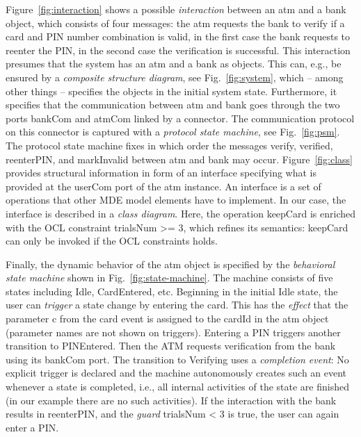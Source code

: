 \documentclass[10pt,fleqn,final]{scrreprt}
\newenvironment{definitions}[0]{\medskip }{}
\newcommand{\uml}[1]{\textsf{#1}}
\begin{document}
\begin{definitions}
Figure~\ref{fig:interaction} shows a possible \emph{interaction}
between an \uml{atm} and a \uml{bank} object, which consists of
four messages: the \uml{atm} requests the \uml{bank} to \uml{verify}
if a card and PIN number combination is valid, in the first case the
\uml{bank} requests to reenter the PIN, in the second case the
verification is successful.  This interaction presumes that the system
has an \uml{atm} and a \uml{bank} as objects. This can, e.g., be
ensured by a \emph{composite structure diagram}, see
Fig.~\ref{fig:system}, which -- among other things -- specifies the
objects in the initial system state.  Furthermore, it specifies that
the communication between \uml{atm} and \uml{bank} goes through the
two ports \uml{bankCom} and \uml{atmCom} linked by a connector.  The
communication protocol on this connector is captured with a
\emph{protocol state machine}, see Fig.~\ref{fig:psm}.  The protocol
state machine fixes in which order the messages \uml{verify},
\uml{verified}, \uml{reenterPIN}, and \uml{markInvalid} between
\uml{atm} and \uml{bank} may occur.  Figure~\ref{fig:class} provides
structural information in form of an interface specifying what is
provided at the \uml{userCom} port of the \uml{atm} instance. An
interface is a set of operations that other MDE model elements have to
implement. In our case, the interface is described in a \emph{class
  diagram}. Here, the operation \uml{keepCard} is enriched with the
OCL constraint \uml{trialsNum >= 3}, which refines its semantics:
\uml{keepCard} can only be invoked if the OCL constraints holds.

Finally, the dynamic behavior of the \uml{atm} object is specified by
the \emph{behavioral state machine} shown in
Fig.~\ref{fig:state-machine}. The machine consists of five states
including \uml{Idle}, \uml{CardEntered}, etc.  Beginning in the
initial \uml{Idle} state, the user can \emph{trigger} a state change
by entering the \uml{card}. This has the \emph{effect} that the
parameter \uml{c} from the \uml{card} event is assigned to the
\uml{cardId} in the \uml{atm} object (parameter names are not shown on
triggers). Entering a \uml{PIN} triggers another transition to
\uml{PINEntered}.  Then the ATM requests verification from the bank
using its \uml{bankCom} port.  The transition to \uml{Verifying} uses
a \emph{completion event}: No explicit trigger is declared and the
machine autonomously creates such an event whenever a state is
completed, i.e., all internal activities of the state are finished (in
our example there are no such activities).  If the interaction with
the bank results in \uml{reenterPIN}, and the \emph{guard}
\uml{trialsNum < 3} is true, the user can again enter a \uml{PIN}.



\end{definitions}
\end{document}
